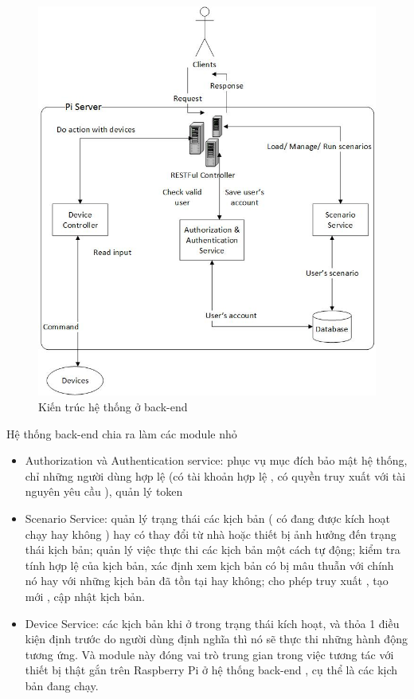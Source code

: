 \documentclass[11pt,a4paper,oneside]{book}
\begin{document}
\begin{figure}[h]
  \centering
     \includegraphics[width=15cm]{3-architecture-back-end}
  \caption{Kiến trúc hệ thống ở back-end}\label{fig:3-architecture-back-end}
\end{figure} 

Hệ thống back-end chia ra làm các module nhỏ

\begin{itemize}[topsep=1mm,itemsep=-0.5mm]
\item Authorization và Authentication service: phục vụ mục đích bảo mật hệ thống, chỉ những người dùng hợp lệ (có tài khoản hợp lệ , có quyền truy xuất với tài nguyên yêu cầu ), quản lý token
\item Scenario Service: quản lý trạng thái các kịch bản ( có đang được kích hoạt chạy hay không ) hay có thay đổi từ nhà hoặc thiết bị ảnh hưởng đến trạng thái kịch bản; quản lý việc thực thi các kịch bản một cách tự động; kiểm tra tính hợp lệ của kịch bản, xác định xem kịch bản có bị mâu thuẫn với chính nó hay với những kịch bản đã tồn tại hay không; cho phép truy xuất , tạo mới , cập nhật kịch bản.
\item Device Service: các kịch bản khi ở trong trạng thái kích hoạt, và thỏa 1 điều kiện định trước do người dùng định nghĩa thì nó sẽ thực thi những hành động tương ứng. Và module này đóng vai trò trung gian trong việc tương tác với thiết bị thật gắn trên Raspberry Pi ở hệ thống back-end , cụ thể là các kịch bản đang chạy.
\vspace{1mm}
\end{itemize}
\end{document}
